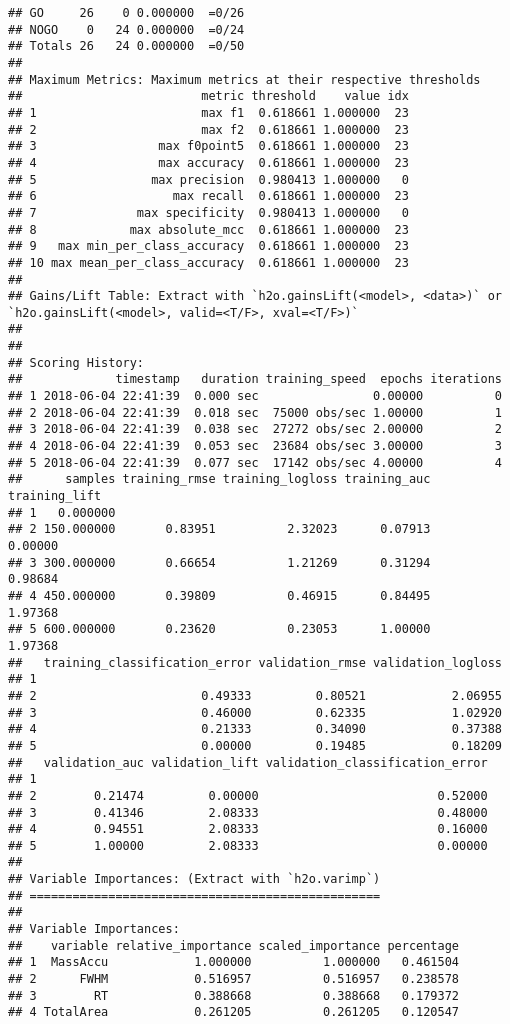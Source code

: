 \documentclass[]{article}
\begin{document}
\begin{verbatim}
## GO     26    0 0.000000  =0/26
## NOGO    0   24 0.000000  =0/24
## Totals 26   24 0.000000  =0/50
## 
## Maximum Metrics: Maximum metrics at their respective thresholds
##                         metric threshold    value idx
## 1                       max f1  0.618661 1.000000  23
## 2                       max f2  0.618661 1.000000  23
## 3                 max f0point5  0.618661 1.000000  23
## 4                 max accuracy  0.618661 1.000000  23
## 5                max precision  0.980413 1.000000   0
## 6                   max recall  0.618661 1.000000  23
## 7              max specificity  0.980413 1.000000   0
## 8             max absolute_mcc  0.618661 1.000000  23
## 9   max min_per_class_accuracy  0.618661 1.000000  23
## 10 max mean_per_class_accuracy  0.618661 1.000000  23
## 
## Gains/Lift Table: Extract with `h2o.gainsLift(<model>, <data>)` or `h2o.gainsLift(<model>, valid=<T/F>, xval=<T/F>)`
## 
## 
## Scoring History: 
##             timestamp   duration training_speed  epochs iterations
## 1 2018-06-04 22:41:39  0.000 sec                0.00000          0
## 2 2018-06-04 22:41:39  0.018 sec  75000 obs/sec 1.00000          1
## 3 2018-06-04 22:41:39  0.038 sec  27272 obs/sec 2.00000          2
## 4 2018-06-04 22:41:39  0.053 sec  23684 obs/sec 3.00000          3
## 5 2018-06-04 22:41:39  0.077 sec  17142 obs/sec 4.00000          4
##      samples training_rmse training_logloss training_auc training_lift
## 1   0.000000                                                          
## 2 150.000000       0.83951          2.32023      0.07913       0.00000
## 3 300.000000       0.66654          1.21269      0.31294       0.98684
## 4 450.000000       0.39809          0.46915      0.84495       1.97368
## 5 600.000000       0.23620          0.23053      1.00000       1.97368
##   training_classification_error validation_rmse validation_logloss
## 1                                                                 
## 2                       0.49333         0.80521            2.06955
## 3                       0.46000         0.62335            1.02920
## 4                       0.21333         0.34090            0.37388
## 5                       0.00000         0.19485            0.18209
##   validation_auc validation_lift validation_classification_error
## 1                                                               
## 2        0.21474         0.00000                         0.52000
## 3        0.41346         2.08333                         0.48000
## 4        0.94551         2.08333                         0.16000
## 5        1.00000         2.08333                         0.00000
## 
## Variable Importances: (Extract with `h2o.varimp`) 
## =================================================
## 
## Variable Importances: 
##    variable relative_importance scaled_importance percentage
## 1  MassAccu            1.000000          1.000000   0.461504
## 2      FWHM            0.516957          0.516957   0.238578
## 3        RT            0.388668          0.388668   0.179372
## 4 TotalArea            0.261205          0.261205   0.120547
\end{verbatim}
\end{document}
